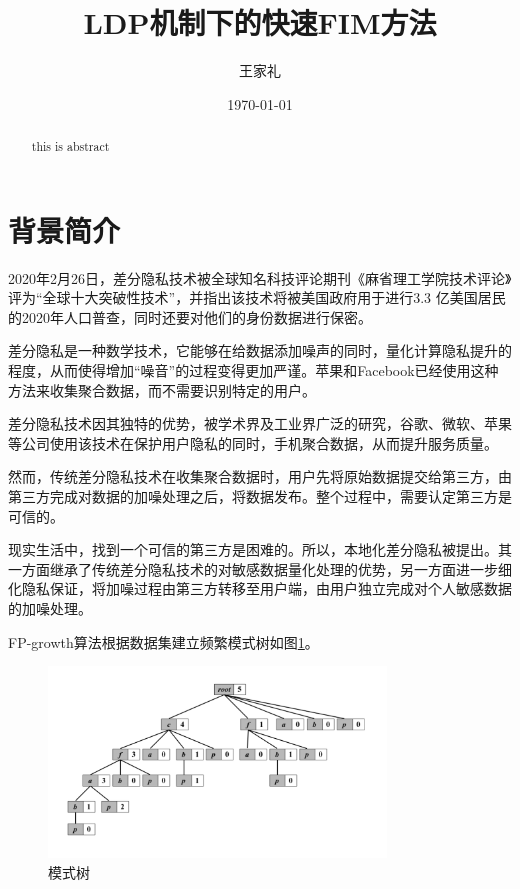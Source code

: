 \documentclass[UTF8]{ctexart}
\title{LDP机制下的快速FIM方法}
\author{王家礼}
\date{\today}
\begin{document}
\maketitle %

\begin{abstract}%
this is abstract
\end{abstract}

\section{背景简介}

2020年2月26日，差分隐私技术被全球知名科技评论期刊《麻省理工学院技术评论》评为“全球十大突破性技术”，并指出该技术将被美国政府用于进行3.3 亿美国居民的2020年人口普查，同时还要对他们的身份数据进行保密。

差分隐私是一种数学技术，它能够在给数据添加噪声的同时，量化计算隐私提升的程度，从而使得增加“噪音”的过程变得更加严谨。苹果和Facebook已经使用这种方法来收集聚合数据，而不需要识别特定的用户。

差分隐私技术因其独特的优势，被学术界及工业界广泛的研究，谷歌、微软、苹果等公司使用该技术在保护用户隐私的同时，手机聚合数据，从而提升服务质量。

然而，传统差分隐私技术在收集聚合数据时，用户先将原始数据提交给第三方，由第三方完成对数据的加噪处理之后，将数据发布。整个过程中，需要认定第三方是可信的。

现实生活中，找到一个可信的第三方是困难的。所以，本地化差分隐私被提出。其一方面继承了传统差分隐私技术的对敏感数据量化处理的优势，另一方面进一步细化隐私保证，将加噪过程由第三方转移至用户端，由用户独立完成对个人敏感数据的加噪处理。

FP-growth算法根据数据集建立频繁模式树如图\ref{fig:fptree}。
  \begin{figure}[h]
    \centering
    \includegraphics[width=0.8\textwidth]{123.pdf}
    \caption{模式树}
    \label{fig:fptree}
  \end{figure}
\end{document}
